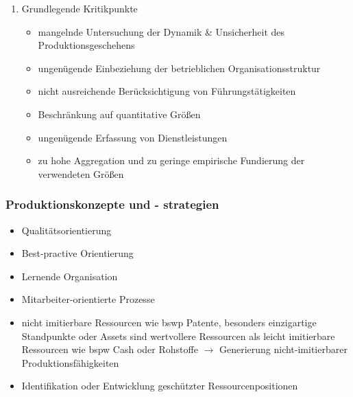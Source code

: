 \documentclass[11pt]{article}
\begin{document}
\begin{enumerate}
\item Grundlegende Kritikpunkte
\label{sec:org8a559f5}
\begin{itemize}
\item mangelnde Untersuchung der Dynamik \& Unsicherheit des Produktionsgeschehens
\item ungenügende Einbeziehung der betrieblichen Organisationsstruktur
\item nicht ausreichende Berücksichtigung von Führungstätigkeiten
\item Beschränkung auf quantitative Größen
\item ungenügende Erfassung von Dienstleistungen
\item zu hohe Aggregation und zu geringe empirische Fundierung der verwendeten Größen
\end{itemize}
\end{enumerate}

\subsubsection{Produktionskonzepte und - strategien}
\label{sec:org2b34487}
\begin{itemize}
\item Qualitätsorientierung
\item Best-practive Orientierung
\item Lernende Organisation
\item Mitarbeiter-orientierte Prozesse
\item nicht imitierbare Ressourcen wie bswp Patente, besonders einzigartige Standpunkte oder Assets sind wertvollere Ressourcen als leicht imitierbare Ressourcen wie bspw Cash oder Rohstoffe \(\rightarrow\) Generierung nicht-imitierbarer Produktionsfähigkeiten
\item Identifikation oder Entwicklung geschützter Ressourcenpositionen
\end{itemize}
\end{document}
